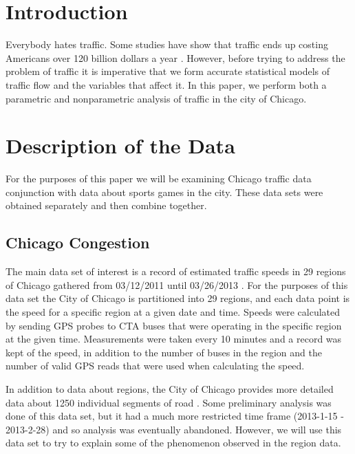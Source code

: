 \documentclass[12pt]{article}
\begin{document}
\maketitle
\begin{multicols*}{2}
\section{Introduction}
Everybody hates traffic. Some studies have show that traffic ends up costing Americans over 120 billion dollars a year \cite{costoftraffic}. However, before trying to address the problem of traffic it is imperative that we form accurate statistical models of traffic flow and the variables that affect it. In this paper, we perform both a parametric and nonparametric analysis of traffic in the city of Chicago.
\section{Description of the Data}
For the purposes of this paper we will be examining Chicago traffic data conjunction with data about sports games in the city. These data sets were obtained separately and then combine together.
\subsection{Chicago Congestion}
The main data set of interest is a record of estimated traffic speeds in 29 regions of Chicago gathered from 03/12/2011 until 03/26/2013 \cite{regiondataset}. For the purposes of this data set the City of Chicago is partitioned into 29 regions, and each data point is the speed for a specific region at a given date and time. Speeds were calculated by sending GPS probes to CTA buses that were operating in the specific region at the given time. Measurements were taken every 10 minutes and a record was kept of the speed, in addition to the number of buses in the region and the number of valid GPS reads that were used when calculating the speed.

In addition to data about regions, the City of Chicago provides more detailed data about 1250 individual segments of road \cite{segmentdataset}. Some preliminary analysis was done of this data set, but it had a much more restricted time frame (2013-1-15 - 2013-2-28) and so analysis was eventually abandoned. However, we will use this data set to try to explain some of the phenomenon observed in the region data.

\end{multicols*}
\end{document}
